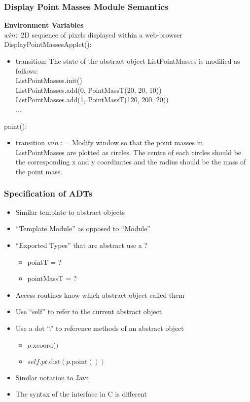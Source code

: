 \documentclass[t,12pt,numbers,fleqn,handout]{beamer}
\begin{document}
\begin{frame}
\frametitle{Display Point Masses Module Semantics}

\textbf{Environment Variables}\\
$\mathit{win}:$ 2D sequence of pixels displayed within a web-browser \\

\noindent DisplayPointMassesApplet():
\begin{itemize}
\item transition: The state of the abstract object ListPointMasses is modified as follows:\\
ListPointMasses.init()\\
ListPointMasses.add(0, PointMassT(20, 20, 10))\\
ListPointMasses.add(1, PointMassT(120, 200, 20))\\
...
\end{itemize}

\noindent paint():
\begin{itemize}
\item transition $win := $ Modify window so that the point masses in ListPointMasses 
are plotted as circles.  The centre of each circles should be the corresponding x and y coordinates and the radius should
be the mass of the point mass.
\end{itemize}

\end{frame}


\begin{frame}
\frametitle{Specification of ADTs}
\begin{itemize}
\item Similar template to abstract objects
\item ``Template Module'' as opposed to ``Module''
\item ``Exported Types'' that are abstract use a ?
\begin{itemize}
\item pointT = ?
\item pointMassT = ?
\end{itemize}
\item Access routines know which abstract object called them
\item Use ``self'' to refer to the current abstract object
\item Use a dot ``.'' to reference methods of an abstract object
\begin{itemize}
\item $p.\mbox{xcoord()}$
\item $\mathit{self}.pt.\mbox{dist}(p.\mbox{point}())$
\end{itemize}
\item Similar notation to Java
\item The syntax of the interface in C is different
\end{itemize}
\end{frame}
\end{document}
